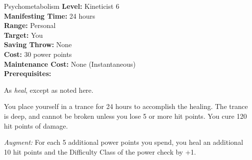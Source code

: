 {Psychometabolism}
{
	\textbf{Level:}
	Kineticist 6\\
	\textbf{Manifesting Time:}
	24 hours\\
	\textbf{Range:}
	Personal\\
	\textbf{Target:}
	You\\
	\textbf{Saving Throw:}
	None\\
	\textbf{Cost:}
	30 power points\\
	\textbf{Maintenance Cost:}
	None (Instantaneous)\\
	\textbf{Prerequisites:}
	\\
}
{
	As \emph{heal}, except as noted here.

	You place yourself in a trance for 24 hours to accomplish the healing. The trance is deep, and cannot be broken unless you lose 5 or more hit points. You cure 120 hit points of damage.

	\textit{Augment:} For each 5 additional power points you spend, you heal an additional 10 hit points and the Difficulty Class of the power check by +1.
}